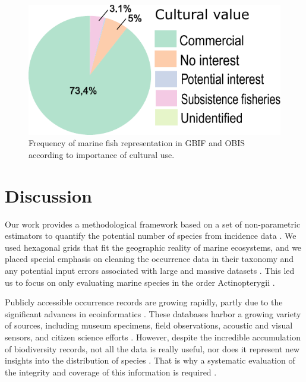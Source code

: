 \documentclass[12pt,authoryear]{elsarticle}
\providecommand{\DIFaddbeginFL}{} %
\providecommand{\DIFaddendFL}{} %
\providecommand{\DIFdelbeginFL}{} %
\providecommand{\DIFdelendFL}{} %
\begin{document}
\begin{figure}[h]
  \centering
  \DIFdelbeginFL %
\DIFdelendFL \DIFaddbeginFL \includegraphics[width=.65\textwidth]{old_Figs/Fig6}
  \DIFaddendFL \caption{Frequency of marine fish representation in GBIF and OBIS according to importance of cultural use.}
  \label{fig:A_importance}
\end{figure}


\section{Discussion}

Our work provides a methodological framework based on a set of non-parametric estimators to quantify the potential number of species from incidence data \citep{chao2009}. We used hexagonal grids that fit the geographic reality of marine ecosystems, and we placed special emphasis on cleaning the occurrence data in their taxonomy \citep{jin2020bdcleaner} and any potential input errors associated with large and massive datasets \citep{zizka2020}. This led us to focus on only evaluating marine species in the order Actinopterygii \citep{alo2021macroecology}.

Publicly accessible occurrence records are growing rapidly, partly due to the significant advances in ecoinformatics  
\citep{lenoir2020species,oliver2021}. These databases harbor a growing variety of sources, including museum specimens, field observations, acoustic and visual sensors, and citizen science efforts \citep{amano2016}. However, despite the incredible accumulation of biodiversity records, not all the data is really useful, nor does it represent new insights into the distribution of species 
\citep{bayraktarov2019,zizka2020}. That is why a systematic evaluation of the integrity and coverage of this information is required \citep{troia2017}.
\end{document}
